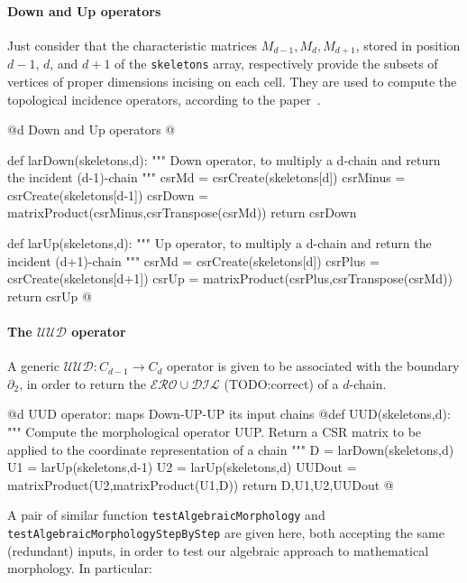 \documentclass[11pt,oneside]{article}	%
\begin{document}
\paragraph{Down and Up operators} Just consider that the characteristic matrices $M_{d-1},M_{d},M_{d+1}$,  stored in position $d-1$, $d$, and $d+1$ of the \texttt{skeletons} array, respectively provide the subsets of vertices of proper dimensions incising on each cell. They are used to compute the topological incidence operators, according to the paper~\cite{Dicarlo:2014:TNL:2543138.2543294}.

@d Down and Up operators
@{def larDown(skeletons,d):
	""" Down operator, to multiply a d-chain and return the incident (d-1)-chain """
	csrMd = csrCreate(skeletons[d])
	csrMinus = csrCreate(skeletons[d-1])
	csrDown = matrixProduct(csrMinus,csrTranspose(csrMd))
	return csrDown
	
def larUp(skeletons,d):
	""" Up operator, to multiply a d-chain and return the incident (d+1)-chain """
	csrMd = csrCreate(skeletons[d])
	csrPlus = csrCreate(skeletons[d+1])
	csrUp = matrixProduct(csrPlus,csrTranspose(csrMd))
	return csrUp	
@}

\paragraph{The $\mathcal{UUD}$ operator}
A generic $\mathcal{UUD}: C_{d-1} \to C_{d}$ operator is given to be associated with the boundary $\partial_2$, in order to return the $\mathcal{ERO}\cup\mathcal{DIL}$ (TODO:correct) of a $d$-chain.

@d UUD operator: maps Down-UP-UP its input chains
@{def UUD(skeletons,d):
	""" Compute the morphological operator UUP.
		Return a CSR matrix to be applied to the coordinate representation of a chain
	""" 
	D = larDown(skeletons,d)
	U1 = larUp(skeletons,d-1)
	U2 = larUp(skeletons,d)
	UUDout = matrixProduct(U2,matrixProduct(U1,D))
	return D,U1,U2,UUDout
@}

A pair of similar function \texttt{testAlgebraicMorphology} and \texttt{testAlgebraicMorphologyStepByStep} are given here, both accepting the same (redundant) inputs, in order to test our algebraic approach to mathematical morphology. In particular: 
\end{document}
